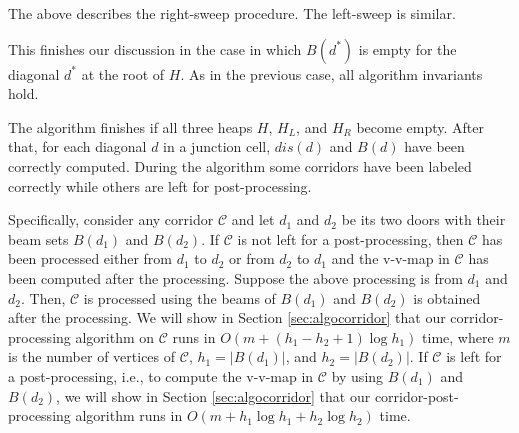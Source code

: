 \documentclass[english,runningheads,11pt]{llncs-revised}
\def\calC{\mathcal{C}}
\begin{document}
The above describes the right-sweep procedure. The
left-sweep is similar.

This finishes our discussion in the case in which $B(d^*)$ is empty for
the diagonal $d^*$ at the root of $H$. As in the previous case, all
algorithm invariants hold.



The algorithm finishes if all three heaps $H$, $H_L$, and $H_R$ become
empty. After that, for each diagonal $d$ in a junction cell, $dis(d)$
and $B(d)$ have been correctly computed. During the algorithm
some corridors have been labeled correctly while others are left for
post-processing.



Specifically, consider any corridor $\calC$ and let $d_1$ and $d_2$ be
its two doors with their beam sets $B(d_1)$ and $B(d_2)$. If $\calC$ is not left for a post-processing, then $\calC$ has been processed either from $d_1$ to $d_2$ or from $d_2$ to $d_1$ and the v-v-map in $\calC$ has been computed after the processing. Suppose the above processing is from $d_1$ and $d_2$. Then, $\calC$ is processed using the beams of $B(d_1)$ and $B(d_2)$ is obtained after the processing.
We will show in Section
\ref{sec:algocorridor} that our corridor-processing algorithm on $\calC$ runs in $O(m+(h_1-h_2+1)\log
h_1)$ time, where $m$ is the number of vertices of $\calC$,
$h_1=|B(d_1)|$, and $h_2=|B(d_2)|$.
If $\calC$ is left for a post-processing, i.e., to compute the
v-v-map in $\calC$ by using $B(d_1)$ and $B(d_2)$, we will show in
Section \ref{sec:algocorridor} that our
corridor-post-processing algorithm runs in $O(m+h_1\log h_1+h_2\log
h_2)$ time.
\end{document}
